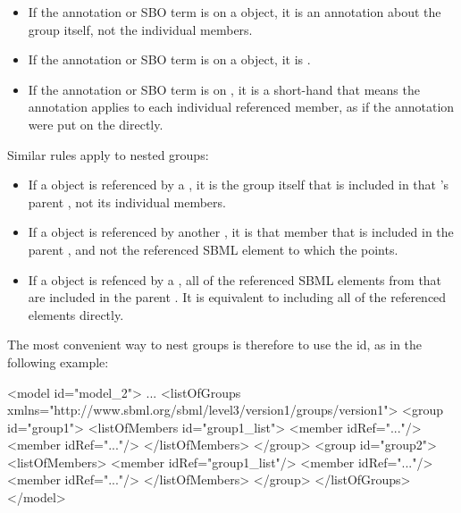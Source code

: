 \begin{itemize}

\item If the annotation or SBO term is on a \Group object, it is an annotation about the group itself, not the individual members.

\item If the annotation or SBO term is on a \Member object, it is .

\item If the annotation or SBO term is on \ListOfMembers, it is a short-hand that means the annotation applies to each individual referenced member, as if the annotation were put on the  directly.

\end{itemize}

\begin{blockChanged}
Similar rules apply to nested groups:

\begin{itemize}

\item If a \Group object is referenced by a \Member, it is the group itself that is included in that \Member's parent \Group, not its individual members.

\item If a \Member object is referenced by another \Member, it is that member that is included in the parent \Group, and not the referenced SBML element to which the \Member points.

\item If a \ListOfMembers object is refenced by a \Member, all of the referenced SBML elements from that \ListOfMembers are included in the parent \Group.  It is equivalent to including all of the referenced elements directly.

\end{itemize}

The most convenient way to nest groups is therefore to use the \ListOfMembers id, as in the following example:

\end{blockChanged}


\begin{example}
<model id="model_2"> 
  ... 
  <listOfGroups xmlns="http://www.sbml.org/sbml/level3/version1/groups/version1"> 
    <group id="group1"> 
      <listOfMembers id="group1_list"> 
        <member idRef="..."/> 
        <member idRef="..."/> 
      </listOfMembers> 
    </group> 
    <group id="group2"> 
      <listOfMembers> 
        <member idRef="group1_list"/> 
        <member idRef="..."/> 
        <member idRef="..."/> 
      </listOfMembers> 
    </group> 
  </listOfGroups> 
</model> 
\end{example}

